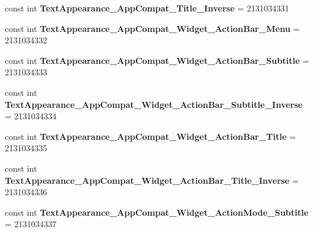 \begin{DoxyCompactItemize}
\item 
\hypertarget{classClient_1_1Droid_1_1Resource_1_1Style_aaf21e861a73cb5793d768e60db113f6a}{}const int {\bfseries Text\+Appearance\+\_\+\+App\+Compat\+\_\+\+Title\+\_\+\+Inverse} = 2131034331\label{classClient_1_1Droid_1_1Resource_1_1Style_aaf21e861a73cb5793d768e60db113f6a}

\item 
\hypertarget{classClient_1_1Droid_1_1Resource_1_1Style_a5042f3d02db729cffa57aa2cea844058}{}const int {\bfseries Text\+Appearance\+\_\+\+App\+Compat\+\_\+\+Widget\+\_\+\+Action\+Bar\+\_\+\+Menu} = 2131034332\label{classClient_1_1Droid_1_1Resource_1_1Style_a5042f3d02db729cffa57aa2cea844058}

\item 
\hypertarget{classClient_1_1Droid_1_1Resource_1_1Style_a9507b58dd6508c2257519672e34a57ef}{}const int {\bfseries Text\+Appearance\+\_\+\+App\+Compat\+\_\+\+Widget\+\_\+\+Action\+Bar\+\_\+\+Subtitle} = 2131034333\label{classClient_1_1Droid_1_1Resource_1_1Style_a9507b58dd6508c2257519672e34a57ef}

\item 
\hypertarget{classClient_1_1Droid_1_1Resource_1_1Style_ab610d26f31b8b5a37d53e604065830d9}{}const int {\bfseries Text\+Appearance\+\_\+\+App\+Compat\+\_\+\+Widget\+\_\+\+Action\+Bar\+\_\+\+Subtitle\+\_\+\+Inverse} = 2131034334\label{classClient_1_1Droid_1_1Resource_1_1Style_ab610d26f31b8b5a37d53e604065830d9}

\item 
\hypertarget{classClient_1_1Droid_1_1Resource_1_1Style_a370af5674c42df8405b6ebebe4dd706d}{}const int {\bfseries Text\+Appearance\+\_\+\+App\+Compat\+\_\+\+Widget\+\_\+\+Action\+Bar\+\_\+\+Title} = 2131034335\label{classClient_1_1Droid_1_1Resource_1_1Style_a370af5674c42df8405b6ebebe4dd706d}

\item 
\hypertarget{classClient_1_1Droid_1_1Resource_1_1Style_a3b73c14e37ef3726ed0bdef5fe403a12}{}const int {\bfseries Text\+Appearance\+\_\+\+App\+Compat\+\_\+\+Widget\+\_\+\+Action\+Bar\+\_\+\+Title\+\_\+\+Inverse} = 2131034336\label{classClient_1_1Droid_1_1Resource_1_1Style_a3b73c14e37ef3726ed0bdef5fe403a12}

\item 
\hypertarget{classClient_1_1Droid_1_1Resource_1_1Style_aa8dc99ad1e5fb1bfd3f1dca380c1a4c7}{}const int {\bfseries Text\+Appearance\+\_\+\+App\+Compat\+\_\+\+Widget\+\_\+\+Action\+Mode\+\_\+\+Subtitle} = 2131034337\label{classClient_1_1Droid_1_1Resource_1_1Style_aa8dc99ad1e5fb1bfd3f1dca380c1a4c7}


\end{DoxyCompactItemize}
